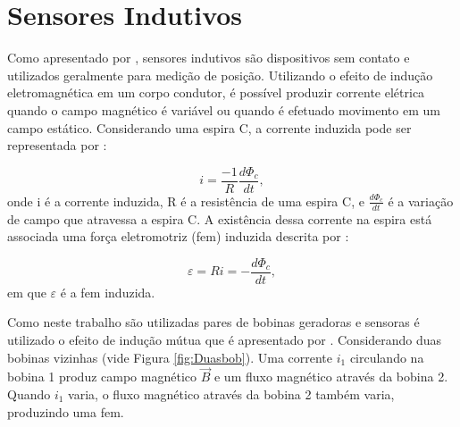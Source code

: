 \section{Sensores Indutivos}
\label{sec:indutivo}

Como apresentado por , sensores indutivos são dispositivos sem contato e utilizados geralmente 
para medição de posição. Utilizando o efeito de indução eletromagnética em um corpo condutor, é possível produzir 
corrente elétrica quando o campo magnético é variável ou quando é efetuado movimento em um campo estático. Considerando uma espira 
C, a corrente induzida pode ser representada por \cite{moyses}:

\begin{equation}
  i = \frac{-1}{R} \frac{d \Phi_c}{dt},
  \label{eq:I_indu}
\end{equation}
onde i é a corrente induzida, R é a resistência de uma espira C, e $\frac{d \Phi_c}{dt}$ é a variação de campo que atravessa a 
espira C. A existência dessa corrente na espira está associada uma força eletromotriz (fem) induzida descrita por \cite{moyses}:

\begin{equation}
  \varepsilon = Ri = -\frac{d\Phi_c}{dt},
  \label{eq:fem_ind}
\end{equation}
em que $\varepsilon$ é a fem induzida.
 
 Como neste trabalho são utilizadas pares de bobinas geradoras e sensoras é utilizado o efeito de indução mútua que é 
apresentado por . Considerando duas bobinas vizinhas (vide Figura \ref{fig:Duasbob}). Uma corrente $i_1$ 
circulando na bobina 1 produz campo magnético \textbf{$\overrightarrow{B}$} e um fluxo magnético através da bobina 2. Quando 
$i_1$ varia, o fluxo magnético através da bobina 2 também varia, produzindo uma fem.

